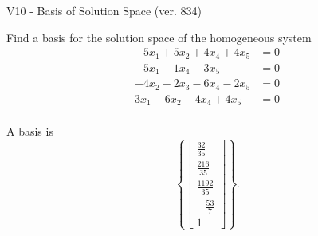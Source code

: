 \begin{exercise}
  \begin{exerciseTitle}V10 - Basis of Solution Space (ver. 834)\end{exerciseTitle}
  \begin{exerciseStatement}
    Find a basis for the solution space of the homogeneous system 
\begin{align*}
 -5 x_ 1 + 5 x_ 2 + 4 x_ 4 + 4 x_ 5 &= 0  \\ 
  -5 x_ 1 -1 x_ 4 -3 x_ 5 &= 0  \\ 
  + 4 x_ 2 -2 x_ 3 -6 x_ 4 -2 x_ 5 &= 0  \\ 
  3 x_ 1 -6 x_ 2 -4 x_ 4 + 4 x_ 5 &= 0  \\ 
 \end{align*}


 
  \end{exerciseStatement}

  \begin{exerciseAnswer}
   A basis is   
\[\left\{\left[\begin{array}{c}
\frac{32}{35} \\
\frac{216}{35} \\
\frac{1192}{35} \\
-\frac{53}{7} \\
1
\end{array}\right]\right\}.\]

  


  \end{exerciseAnswer}
\end{exercise}